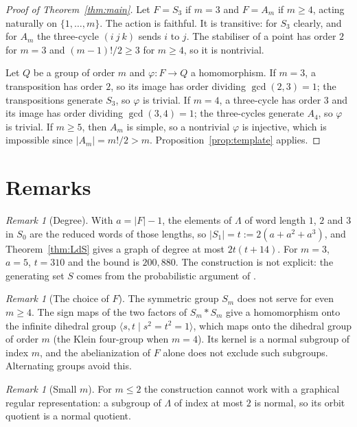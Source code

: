 \documentclass[11pt]{amsart}
\theoremstyle{definition}
\theoremstyle{remark}
\newtheorem{remark}[theorem]{Remark}
\begin{document}
\begin{proof}[Proof of Theorem~\ref{thm:main}]
Let $F=S_3$ if $m=3$ and $F=A_m$ if $m\ge4$, acting naturally on $\{1,\dots,m\}$. The action is faithful. It is transitive: for $S_3$ clearly, and for $A_m$ the three-cycle $(i\ j\ k)$ sends $i$ to $j$. The stabiliser of a point has order $2$ for $m=3$ and $(m-1)!/2\ge3$ for $m\ge4$, so it is nontrivial.

Let $Q$ be a group of order $m$ and $\varphi\colon F\to Q$ a homomorphism. If $m=3$, a transposition has order $2$, so its image has order dividing $\gcd(2,3)=1$; the transpositions generate $S_3$, so $\varphi$ is trivial. If $m=4$, a three-cycle has order $3$ and its image has order dividing $\gcd(3,4)=1$; the three-cycles generate $A_4$, so $\varphi$ is trivial. If $m\ge5$, then $A_m$ is simple, so a nontrivial $\varphi$ is injective, which is impossible since $|A_m|=m!/2>m$. Proposition~\ref{prop:template} applies.
\end{proof}

\section{Remarks}

\begin{remark}[Degree]
With $a=|F|-1$, the elements of $\Lambda$ of word length $1$, $2$ and $3$ in $S_0$ are the reduced words of those lengths, so $|S_1|=t:=2(a+a^2+a^3)$, and Theorem~\ref{thm:LdS} gives a graph of degree at most $2t(t+14)$. For $m=3$, $a=5$, $t=310$ and the bound is $200{,}880$. The construction is not explicit: the generating set $S$ comes from the probabilistic argument of \cite{LdS}.
\end{remark}

\begin{remark}[The choice of $F$]
The symmetric group $S_m$ does not serve for even $m\ge4$. The sign maps of the two factors of $S_m*S_m$ give a homomorphism onto the infinite dihedral group $\langle s,t\mid s^2=t^2=1\rangle$, which maps onto the dihedral group of order $m$ (the Klein four-group when $m=4$). Its kernel is a normal subgroup of index $m$, and the abelianization of $F$ alone does not exclude such subgroups. Alternating groups avoid this.
\end{remark}

\begin{remark}[Small $m$]
For $m\le2$ the construction cannot work with a graphical regular representation: a subgroup of $\Lambda$ of index at most $2$ is normal, so its orbit quotient is a normal quotient.
\end{remark}
\end{document}
